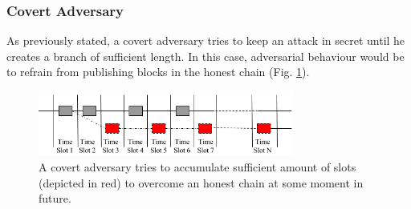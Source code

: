 \documentclass[10pt,a4paper]{article}
\newcommand\myworries[1]{\textcolor{red}{#1}}
\numberwithin{equation}{section} %
\theoremstyle{plain}
\theoremstyle{definition}
\theoremstyle{remark}
\begin{document}
     
     
     
     
     
    \subsubsection{Covert Adversary} \label{sec:covert_adv}
    
    As previously stated, a covert adversary tries to keep an attack in secret until he creates a branch of sufficient length. In this case, adversarial behaviour would be to refrain from publishing blocks in the honest chain (Fig. \ref{fig:covert_adv}). 
    \begin{figure}[h] 
        \centering
        \includegraphics[width=0.75\textwidth]{covert_adv}
        \caption{A covert adversary tries to accumulate sufficient amount of slots (depicted in red) to overcome an honest chain at some moment in future.}
        \label{fig:covert_adv}
    \end{figure}
    
\end{document}
